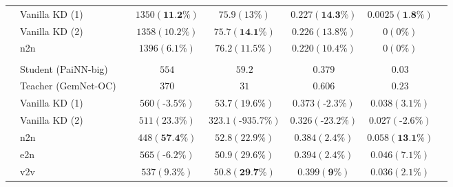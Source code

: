 \documentclass{article}
\begin{document}
\begin{table}[H]
\begin{tabular}{llcccccc}
& Vanilla KD (1)             &   &            $1350 (\textbf{11.2\%})$          &          $75.9 (13\%)$     &     $0.227 (\textbf{14.3\%})$        &  $0.0025 (\textbf{1.8\%})$ \\
& Vanilla KD (2)               &   &            $1358 (10.2\%)$          &          $75.7 (\textbf{14.1\%})$     &     $0.226 (13.8\%)$        &  $0 (0\%)$ &  \\
& n2n              &   &            $1396 (6.1\%)$          &          $76.2 (11.5\%)$     &     $0.220 (10.4\%)$        &  $0 (0\%)$  &  \\
\multicolumn{7}{c}{} \\
\parbox[t]{2mm}{} & Student (PaiNN-big)                  &   &              $554$        &   $59.2$     &   $0.379$      &   $0.03$    \\
& Teacher (GemNet-OC)                      &   &              $370$        &   $31$     &   $0.606$      &   $0.23$     \\
& Vanilla KD (1)           &   &            $560 (\text{-}3.5\%)$          &          $53.7 (19.6\%)$     &     $0.373 (\text{-}2.3\%)$        &  $0.038 (3.1\%)$    \\
& Vanilla KD (2)             &   &            $511 (23.3\%)$          &          $323.1 (\text{-}935.7\%)$     &     $0.326 (\text{-}23.2\%)$        &  $0.027 (\text{-}2.6\%)$   \\
& n2n              &   &            $448 (\textbf{57.4\%})$          &          $52.8 (22.9\%)$     &     $0.384 (2.4\%)$        &  $0.058 (\textbf{13.1\%})$   \\
& e2n               &   &            $565 (\text{-}6.2\%)$          &          $50.9 (29.6\%)$     &     $0.394 (2.4\%)$        &  $0.046 (7.1\%)$     \\
& v2v              &   &            $537 (9.3\%)$          &          $50.8 (\textbf{29.7\%})$     &     $0.399 (\textbf{9\%})$        &  $0.036 (2.1\%)$        
\end{tabular}
\label{tab:ood_both_results}
\end{table}
\end{document}
